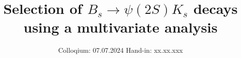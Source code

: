 

\subject{Advanced labaratory course}
\title{Selection of \texorpdfstring{$B_s \to \psi(2S)K_s$}{B_s -> Psi(2S)K_S} decays using a multivariate analysis}
\date{%
  Colloqium: 07.07.2024
  \hspace{3em}
  Hand-in: xx.xx.xxx
}
\newcommand{\signal}{$B_s \to \psi(2S)K_s$}

\usepackage{tikz}
\usepackage{tikz-feynman}
\usepackage{amsmath}




\maketitle
\thispagestyle{empty}
\tableofcontents
\newpage







\printbibliography{}


